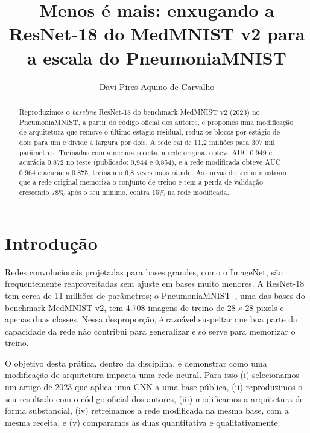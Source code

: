\documentclass[runningheads]{llncs}
\begin{document}
\title{Menos é mais: enxugando a ResNet-18 do MedMNIST v2 para a
escala do PneumoniaMNIST}

\author{Davi Pires Aquino de Carvalho}

\maketitle

\begin{abstract}
Reproduzimos o \textit{baseline} ResNet-18 do benchmark MedMNIST v2
(2023) no PneumoniaMNIST, a partir do código oficial dos autores, e
propomos uma modificação de arquitetura que remove o último estágio
residual, reduz os blocos por estágio de dois para um e divide a
largura por dois. A rede cai de 11,2 milhões para 307 mil parâmetros.
Treinadas com a mesma receita, a rede original obteve AUC 0,949 e
acurácia 0,872 no teste (publicado: 0,944 e 0,854), e a rede
modificada obteve AUC 0,964 e acurácia 0,875, treinando 6,8 vezes mais
rápido. As curvas de treino mostram que a rede original memoriza o
conjunto de treino e tem a perda de validação crescendo 78\% após o
seu mínimo, contra 15\% na rede modificada.

\end{abstract}

\section{Introdução}

Redes convolucionais projetadas para bases grandes, como o ImageNet, são
frequentemente reaproveitadas sem ajuste em bases muito menores. A
ResNet-18~\cite{he2016} tem cerca de 11 milhões de parâmetros; o
PneumoniaMNIST~\cite{medmnistv2}, uma das bases do benchmark MedMNIST v2,
tem 4.708 imagens de treino de $28\times28$ pixels e apenas duas classes.
Nessa desproporção, é razoável suspeitar que boa parte da capacidade da
rede não contribui para generalizar e só serve para memorizar o treino.

O objetivo desta prática, dentro da disciplina, é demonstrar como uma
modificação de arquitetura impacta uma rede neural. Para isso
(i) selecionamos um artigo de 2023 que aplica uma CNN a uma base pública,
(ii) reproduzimos o seu resultado com o código oficial dos autores,
(iii) modificamos a arquitetura de forma substancial,
(iv) retreinamos a rede modificada na mesma base, com a mesma receita, e
(v) comparamos as duas quantitativa e qualitativamente.
\end{document}
